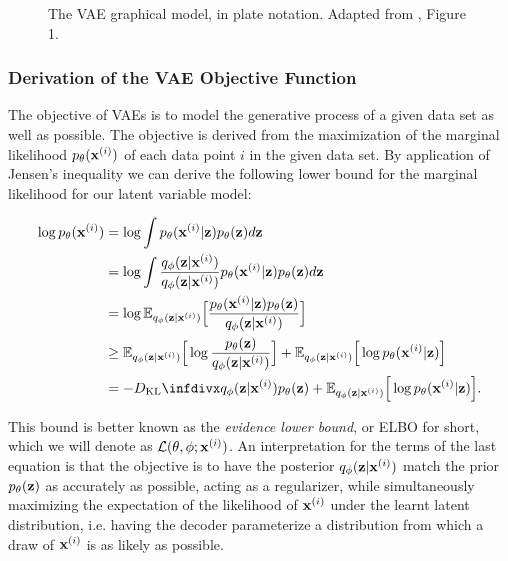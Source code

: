 \begin{figure}[!htb]
  \centering
  \resizebox{0.3\textwidth}{!}{\unskip}
  \caption{The VAE graphical model, in plate notation. Adapted from \cite{aevb}, Figure 1.}
  \label{fig:aevb_plate_notation}
\end{figure}

\subsubsection{Derivation of the VAE Objective Function}


The objective of VAEs is to model the generative process of a given data set as well as possible. The objective is derived from the maximization of the marginal likelihood $p_{\theta}(\mathbf{x}^{(i)})$ of each data point $i$ in the given data set. By application of Jensen's inequality we can derive the following lower bound for the marginal likelihood for our latent variable model:

\begin{equation}
\begin{aligned}
\log \ptheta(\bxi) & = \log \int \ptheta(\bxi \vert \bz) \ptheta(\bz) d\bz \\
                   & = \log \int \frac{\qphi(\bz \vert \bxi)}{\qphi(\bz \vert \bxi)} \ptheta(\bxi \vert \bz) \ptheta(\bz) d\bz \\
                   & = \log \mathbb{E}_{\qphi(\bz \vert \bxi)}\Big[\frac{\ptheta(\bxi \vert \bz) \ptheta(\bz)}{\qphi(\bz \vert \bxi)}\Big] \\
                   & \geq \mathbb{E}_{\qphi(\bz \vert \bxi)}\Big[\log \frac{\ptheta(\bz)}{\qphi(\bz \vert \bxi)}\Big] + \mathbb{E}_{\qphi(\bz \vert \bxi)}\Big[\log \ptheta(\bxi \vert \bz)\Big] \\
                   & = -\dkl{\qphi(\bz \vert \bxi)}{\ptheta(\bz)} + \mathbb{E}_{\qphi(\bz \vert \bxi)}\Big[\log \ptheta(\bxi \vert \bz)\Big].
\end{aligned}
\end{equation}

This bound is better known as the \textit{evidence lower bound}, or ELBO for short, which we will denote as $\mathcal{L}(\theta, \phi; \mathbf{x}^{(i)})$. An interpretation for the terms of the last equation is that the objective is to have the posterior $q_{\phi}(\mathbf{z} \vert \mathbf{x}^{(i)})$ match the prior $p_{\theta}(\mathbf{z})$ as accurately as possible, acting as a regularizer, while simultaneously maximizing the expectation of the likelihood of $\mathbf{x}^{(i)}$ under the learnt latent distribution, i.e. having the decoder parameterize a distribution from which a draw of $\mathbf{x}^{(i)}$ is as likely as possible.

